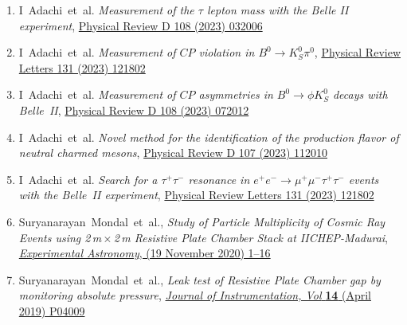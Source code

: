 \documentclass[12pt]{article}
\begin{document}
\begin{enumerate}[a.]
\begin{enumerate}[1.]
  \item I~Adachi~et~al. \emph{Measurement of the $\tau$ lepton mass with the Belle II experiment}, \href{https://doi.org/10.1103/PhysRevD.108.032006}{Physical Review D 108 (2023) 032006}
  \item I~Adachi~et~al. \emph{Measurement of $CP$ violation in $B^0 \rightarrow K^0_{S} \pi^0$}, \href{https://doi.org/10.1103/PhysRevLett.131.111803}{Physical Review Letters 131 (2023) 121802}
  \item I~Adachi~et~al. \emph{Measurement of $CP$ asymmetries in $B^0 \rightarrow \phi K^0_{S}$ decays with Belle~II}, \href{https://doi.org/10.1103/PhysRevD.108.072012}{Physical Review D 108 (2023) 072012}
  \item I~Adachi~et~al. \emph{Novel method for the identification of the production flavor of neutral charmed mesons}, \href{https://doi.org/10.1103/PhysRevD.107.112010}{Physical Review D 107 (2023) 112010}
  \item I~Adachi~et~al. \emph{Search for a $\tau^+\tau^-$ resonance in $e^{+}e^{-}\rightarrow \mu^{+}\mu^{-} \tau^+\tau^-$ events with the Belle~II experiment}, \href{https://doi.org/10.1103/PhysRevLett.131.121802}{Physical Review Letters 131 (2023) 121802}
  \item Suryanarayan~Mondal~et~al., \emph{Study of Particle Multiplicity of Cosmic Ray Events using 2\,m\,$\times$\,2\,m Resistive Plate Chamber Stack at IICHEP-Madurai}, \href{https://doi.org/10.1007/s10686-020-09685-6}{\emph{Experimental Astronomy}, (19 November 2020) 1--16}
  \item Suryanarayan~Mondal~et~al., \emph{Leak test of Resistive Plate Chamber gap by monitoring absolute pressure}, \href{https://doi.org/10.1088/1748-0221/14/04/P04009}{\emph{Journal of Instrumentation, Vol} \textbf{14} (April 2019) P04009}
  \end{enumerate} 
\end{enumerate} 
\end{document}
